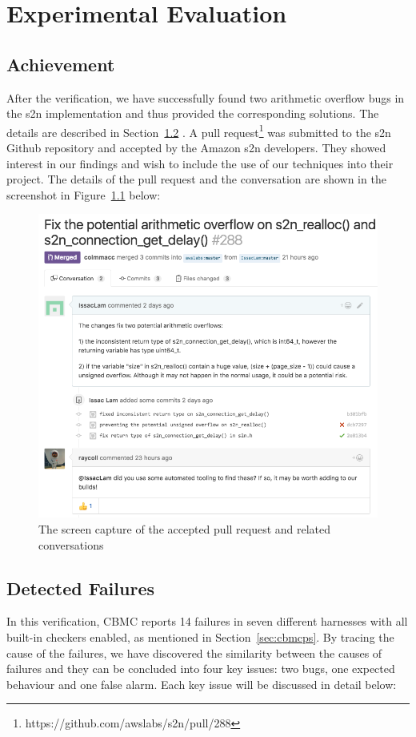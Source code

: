 \chapter{Experimental Evaluation}

\section{Achievement}
After the verification, we have successfully found two arithmetic overflow bugs in the s2n implementation and thus provided the corresponding solutions. The details are described in Section~\ref{seb:df} . A pull request\footnote{https://github.com/awslabs/s2n/pull/288} was submitted to the s2n Github repository and accepted by the Amazon s2n developers. They showed interest in our findings and wish to include the use of our techniques into their project. The details of the pull request and the conversation are shown in the screenshot in Figure~\ref{fig:achievement} below:

\begin{figure} [tp]
    \centering
    \includegraphics[width=\textwidth]{./contents/images/github-pullrequest.png}
    \caption{The screen capture of the accepted pull request and related conversations }
    \label{fig:achievement}
\end{figure}


\section{Detected Failures} \label{seb:df}
In this verification, CBMC reports 14 failures in seven different harnesses with all built-in checkers enabled, as mentioned in Section~\ref{sec:cbmcps}. By tracing the cause of the failures, we have discovered the similarity between the causes of failures and they can be concluded into four key issues: two bugs, one expected behaviour and one false alarm. Each key issue will be discussed in detail below:

